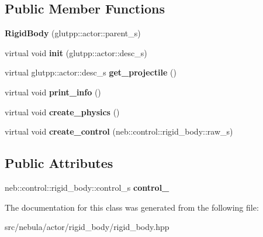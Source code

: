 \subsection*{\-Public \-Member \-Functions}
\begin{DoxyCompactItemize}
\item 
\hypertarget{classneb_1_1Actor_1_1RigidBody_1_1RigidBody_a4a42b50cdc34ed40704fe68a6044aac5}{{\bfseries \-Rigid\-Body} (glutpp\-::actor\-::parent\-\_\-s)}\label{classneb_1_1Actor_1_1RigidBody_1_1RigidBody_a4a42b50cdc34ed40704fe68a6044aac5}

\item 
\hypertarget{classneb_1_1Actor_1_1RigidBody_1_1RigidBody_a49bc7986eea3d48486dc8bdba8b84954}{virtual void {\bfseries init} (glutpp\-::actor\-::desc\-\_\-s)}\label{classneb_1_1Actor_1_1RigidBody_1_1RigidBody_a49bc7986eea3d48486dc8bdba8b84954}

\item 
\hypertarget{classneb_1_1Actor_1_1RigidBody_1_1RigidBody_af9d4be08596daf414fc020ac6c659a6e}{virtual glutpp\-::actor\-::desc\-\_\-s {\bfseries get\-\_\-projectile} ()}\label{classneb_1_1Actor_1_1RigidBody_1_1RigidBody_af9d4be08596daf414fc020ac6c659a6e}

\item 
\hypertarget{classneb_1_1Actor_1_1RigidBody_1_1RigidBody_a113a8004e1564ce207c89101bb015086}{virtual void {\bfseries print\-\_\-info} ()}\label{classneb_1_1Actor_1_1RigidBody_1_1RigidBody_a113a8004e1564ce207c89101bb015086}

\item 
\hypertarget{classneb_1_1Actor_1_1RigidBody_1_1RigidBody_a690d134f35e34636883622d13596592c}{virtual void {\bfseries create\-\_\-physics} ()}\label{classneb_1_1Actor_1_1RigidBody_1_1RigidBody_a690d134f35e34636883622d13596592c}

\item 
\hypertarget{classneb_1_1Actor_1_1RigidBody_1_1RigidBody_a5217679a926c4bdbd9006545751c39ac}{virtual void {\bfseries create\-\_\-control} (neb\-::control\-::rigid\-\_\-body\-::raw\-\_\-s)}\label{classneb_1_1Actor_1_1RigidBody_1_1RigidBody_a5217679a926c4bdbd9006545751c39ac}

\end{DoxyCompactItemize}
\subsection*{\-Public \-Attributes}
\begin{DoxyCompactItemize}
\item 
\hypertarget{classneb_1_1Actor_1_1RigidBody_1_1RigidBody_a873b6a4d9a88f20b12cbae77aeed5607}{neb\-::control\-::rigid\-\_\-body\-::control\-\_\-s {\bfseries control\-\_\-}}\label{classneb_1_1Actor_1_1RigidBody_1_1RigidBody_a873b6a4d9a88f20b12cbae77aeed5607}

\end{DoxyCompactItemize}


\-The documentation for this class was generated from the following file\-:\begin{DoxyCompactItemize}
\item 
src/nebula/actor/rigid\-\_\-body/rigid\-\_\-body.\-hpp\end{DoxyCompactItemize}
